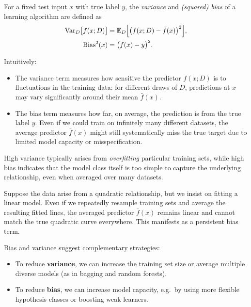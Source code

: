 \documentclass[../main]{subfiles}
\begin{document}
\begin{definition}
    For a fixed test input $x$ with true label $y$, the
    \emph{variance} and \emph{(squared) bias} of a learning algorithm are
    defined as
    \begin{align}
        \mathrm{Var}_D\bigl[f(x;D)\bigr]
        &= \mathbb{E}_{D}
           \Bigl[\bigl(f(x;D)-\bar{f}(x)\bigr)^2\Bigr],\\
        \mathrm{Bias}^2(x)
        &= \bigl(\bar{f}(x) - y\bigr)^2.
    \end{align}
\end{definition}

Intuitively:
\begin{itemize}
    \item The variance term measures how sensitive the predictor $f(x;D)$ is to
    fluctuations in the training data: for different draws of $D$, predictions
    at $x$ may vary significantly around their mean $\bar{f}(x)$.
    \item The bias term measures how far, on average, the prediction is from
    the true label $y$.  Even if we could train on infinitely many different
    datasets, the average predictor $\bar{f}(x)$ might still systematically
    miss the true target due to limited model capacity or misspecification.
\end{itemize}

High variance typically arises from \emph{overfitting} particular training sets,
while high bias indicates that the model class itself is too simple to capture
the underlying relationship, even when averaged over many datasets.

\begin{example}
    Suppose the data arise from a quadratic relationship, but we insist on
    fitting a linear model.  Even if we repeatedly resample training sets and
    average the resulting fitted lines, the averaged predictor $\bar{f}(x)$
    remains linear and cannot match the true quadratic curve everywhere.  This
    manifests as a persistent bias term.
\end{example}

Bias and variance suggest complementary strategies:
\begin{itemize}
    \item To reduce \textbf{variance}, we can increase the training set size or
    average multiple diverse models (as in bagging and random forests).
    \item To reduce \textbf{bias}, we can increase model capacity, e.g.\ by
    using more flexible hypothesis classes or boosting weak learners.
\end{itemize}
\end{document}
